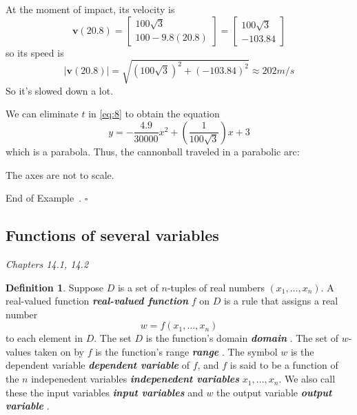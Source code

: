 \documentclass[10pt]{article}
\DeclareRobustCommand{\demph}[1]{%
  \ifmmode
  {\color{Blue}#1}%
  \else
  {\color{Blue}\bfseries\slshape #1}%
  \fi
}
\theoremstyle{definition}
\newtheorem{definition}[theorem]{Definition}
\newtheorem{example}[theorem]{Example}
\renewenvironment{example}
{\begin{oldexample}}
  {\par\smallskip\hfill   End of Example~\theexample. $\square$    \par\end{oldexample}}
\newcommand{\1}[1]{\textbf{1}_{\left[#1\right]}} %
\begin{document}
\begin{example}
  At the moment of impact, its velocity is
  \begin{equation*}
    \mathbf{v}(20.8) =
    \begin{bmatrix}
      100 \sqrt{3}\\100-9.8(20.8)
    \end{bmatrix}
    =
    \begin{bmatrix}
      100 \sqrt{3}\\ -103.84
    \end{bmatrix}
  \end{equation*}
  so its speed is
  \begin{equation*}
    |\mathbf{v}(20.8)| = \sqrt{(100 \sqrt{3})^{2}+ (-103.84)^{2}} \approx 202 m/s
  \end{equation*}
  So it's slowed down a lot.

  
  We can eliminate $t$  in \cref{eq:8} to obtain the equation
  \begin{equation*}
    y = -\frac{4.9}{30000}x^{2} + \left( \frac{1}{100 \sqrt{3}} \right)x +3 
  \end{equation*}
  which is a parabola. Thus, the cannonball traveled in a parabolic arc:

  \begin{center}
  \end{center}
  The axes are not to scale.
\end{example}

\subsection{Functions of several variables}
\textit{Chapters 14.1, 14.2}
\newpage

\begin{definition}
  Suppose $D$ is a set of $n$-tuples of real numbers $(x_{1},\ldots,x_{n})$. A
  \demph{real-valued function}  $f$ on $D$ is a rule that assigns a real
  number
  \begin{equation*}
    w = f(x_{1},\ldots,x_{n})
  \end{equation*}
  to each element in $D$. The set $D$ is the function's \demph{domain}. The
  set of $w$-values taken on by $f$ is the function's \demph{range}. The
  symbol $w$ is the \demph{dependent variable} of $f$, and $f$ is said to be a
  function of the $n$ \demph{indepenedent variables} $x_{1},\ldots,x_{n}$. We
  also call these the \demph{input variables} and $w$ the \demph{output variable}.
\end{definition}
\end{document}
